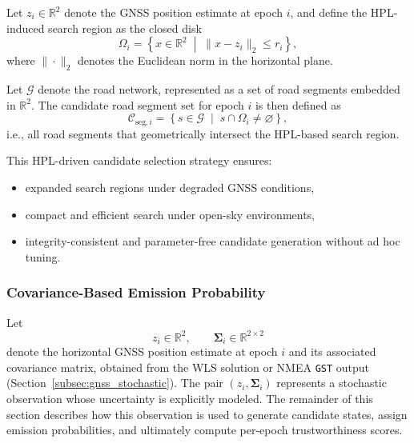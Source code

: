 \documentclass[letterpaper,journal]{IEEEtran}
\begin{document}
Let $z_i \in \mathbb{R}^2$ denote the GNSS position estimate at epoch $i$, and
define the HPL-induced search region as the closed disk
\begin{equation}
\Omega_i
=
\left\{
x \in \mathbb{R}^2 \;\middle|\; \| x - z_i \|_2 \le r_i
\right\},
\end{equation}
where $\| \cdot \|_2$ denotes the Euclidean norm in the horizontal plane.

Let $\mathcal{G}$ denote the road network, represented as a set of road segments
embedded in $\mathbb{R}^2$. The candidate road segment set for epoch $i$ is then
defined as
\begin{equation}
\mathcal{C}_{\text{seg},i}
=
\left\{
s \in \mathcal{G}
\;\middle|\;
s \cap \Omega_i \neq \varnothing
\right\},
\label{eq:candidate_set}
\end{equation}
i.e., all road segments that geometrically intersect the HPL-based search region.

This HPL-driven candidate selection strategy ensures:
\begin{itemize}
    \item expanded search regions under degraded GNSS conditions,
    \item compact and efficient search under open-sky environments,
    \item integrity-consistent and parameter-free candidate generation
          without ad hoc tuning.
\end{itemize}


\subsubsection{Covariance-Based Emission Probability}
\label{subsubsec:states_observations}

Let
\[
z_i \in \mathbb{R}^2,
\qquad
\boldsymbol{\Sigma}_i \in \mathbb{R}^{2\times 2}
\]
denote the horizontal GNSS position estimate at epoch $i$ and its associated covariance matrix, obtained from the WLS solution or NMEA \texttt{GST} output (Section~\ref{subsec:gnss_stochastic}). The pair $(z_i, \boldsymbol{\Sigma}_i)$ represents a stochastic observation whose uncertainty is explicitly modeled. The remainder of this section describes how this observation is used to generate candidate states, assign emission probabilities, and ultimately compute per-epoch trustworthiness scores.
\end{document}
